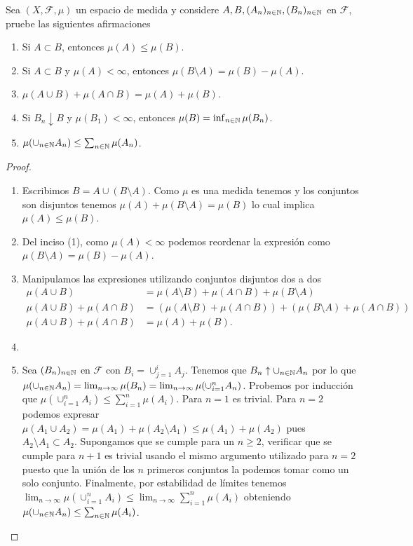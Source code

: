 \begin{statement}{7}
  Sea $(X, \mathcal{F}, \mu)$ un espacio de medida y considere $A, B, (A_n)_{n \in \mathbb N}, (B_n)_{n \in \mathbb N}$ en $\mathcal{F}$, pruebe las siguientes afirmaciones
  \begin{enumerate}
    \item Si $A \subset B$, entonces $\mu(A) \leq \mu(B)$.
    \item Si $A \subset B$ y $\mu(A) < \infty$, entonces $\mu(B \setminus A) = \mu(B) - \mu(A)$.
    \item $\mu(A \cup B) + \mu(A \cap B) = \mu(A) + \mu(B)$.
    \item Si $B_n \downarrow B$ y $\mu(B_1) < \infty$, entonces $\mu(B) = \inf_{n \in \mathbb N} \mu(B_n)$.
    \item $\mu(\cup_{n \in \mathbb N} A_n) \leq \sum_{n \in \mathbb N} \mu(A_n)$.
  \end{enumerate}
\end{statement}

\begin{proof}
  \begin{enumerate}
    \item Escribimos $B = A \cup (B \setminus A)$. Como $\mu$ es una medida tenemos y los conjuntos son disjuntos tenemos
      $\mu(A) + \mu(B \setminus A) = \mu(B)$ lo cual implica $\mu(A) \leq \mu(B)$.
    \item Del inciso (1), como $\mu(A) < \infty$ podemos reordenar la expresi\'on como $\mu(B \setminus A) = \mu(B) - \mu(A)$.
    \item Manipulamos las expresiones utilizando conjuntos disjuntos dos a dos
      \begin{align*}
        \mu(A \cup B) &= \mu(A \setminus B) + \mu(A \cap B) + \mu(B \setminus A)\\
        \mu(A \cup B) + \mu(A \cap B) &= (\mu(A \setminus B) + \mu(A \cap B)) + (\mu(B \setminus A) + \mu(A \cap B))\\
        \mu(A \cup B) + \mu(A \cap B) &= \mu(A) + \mu(B).
      \end{align*}
    \item %
    \item Sea $(B_n)_{n \in \mathbb N}$ en $\mathcal{F}$ con $B_i = \cup_{j = 1}^i A_j$.
      Tenemos que $B_n \uparrow \cup_{n \in \mathbb N} A_n$ por lo que $\mu(\cup_{n \in \mathbb N} A_n) = \lim_{n \to \infty} \mu(B_n) = \lim_{n \to \infty} \mu(\cup_{i = 1}^n A_n)$.
      Probemos por inducci\'on que $\mu(\cup_{i = 1}^n A_i) \leq \sum_{i = 1}^n \mu(A_i)$. Para $n = 1$ es trivial.
      Para $n = 2$ podemos expresar $\mu(A_1 \cup A_2) = \mu(A_1) + \mu(A_2 \setminus A_1) \leq \mu(A_1) + \mu(A_2)$ pues $A_2 \setminus A_1 \subset A_2$.
      Supongamos que se cumple para un $n \geq 2$, verificar que se cumple para $n + 1$ es trivial usando el mismo argumento utilizado para $n = 2$ puesto que la uni\'on de los $n$ primeros conjuntos la podemos tomar como un solo conjunto.
      Finalmente, por estabilidad de l\'imites tenemos $\lim_{n \to \infty} \mu(\cup_{i = 1}^n A_i) \leq \lim_{n \to \infty} \sum_{i = 1}^n \mu(A_i)$ obteniendo $\mu(\cup_{n \in \mathbb N} A_n) \leq \sum_{n \in \mathbb N} \mu(A_i)$.
  \end{enumerate}
\end{proof}

